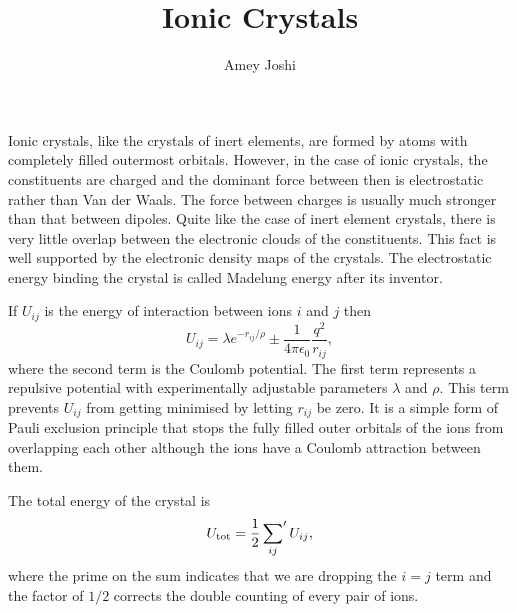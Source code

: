 \documentclass{article}
\title{Ionic Crystals}
\begin{document}
\author{Amey Joshi}
\maketitle
Ionic crystals, like the crystals of inert elements, are formed by atoms with
completely filled outermost orbitals. However, in the case of ionic crystals, 
the constituents are charged and the dominant force between then is 
electrostatic rather than Van der Waals. The force between charges is usually
much stronger than that between dipoles. Quite like the case of inert element
crystals, there is very little overlap between the electronic clouds of the 
constituents. This fact is well supported by the electronic density maps of
the crystals. The electrostatic energy binding the crystal is called Madelung
energy after its inventor.

If $U_{ij}$ is the energy of interaction between ions $i$ and $j$ then 
\begin{equation}\label{e1}
U_{ij} = \lambda e^{-r_{ij}/\rho} \pm \frac{1}{4\pi\epsilon_0}\frac{q^2}{r_{ij}},
\end{equation}
where the second term is the Coulomb potential. The first term represents 
a repulsive potential with experimentally adjustable parameters $\lambda$ and
$\rho$. This term prevents $U_{ij}$ from getting minimised by letting $r_{ij}$
be zero. It is a simple form of Pauli exclusion principle that stops the fully
filled outer orbitals of the ions from overlapping each other although the ions
have a Coulomb attraction between them.

The total energy of the crystal is
\begin{equation}\label{e2}
U_\text{tot} = \frac{1}{2}\sideset{}{^\prime}\sum_{ij}U_{ij},
\end{equation}
where the prime on the sum indicates that we are dropping the $i = j$ term and
the factor of $1/2$ corrects the double counting of every pair of ions.
\end{document}
